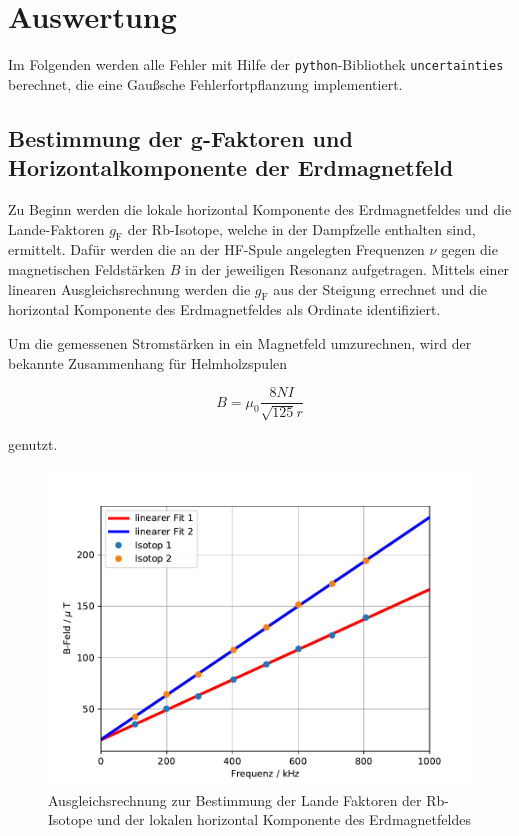 \section{Auswertung}
Im Folgenden werden alle Fehler mit Hilfe der \texttt{python}-Bibliothek
\texttt{uncertainties}\cite{py-uncertainties} berechnet, die eine Gaußsche
Fehlerfortpflanzung implementiert.

\subsection{Bestimmung der g-Faktoren und Horizontalkomponente der Erdmagnetfeld}
Zu Beginn werden die lokale horizontal Komponente des Erdmagnetfeldes und die Lande-Faktoren $g_\text{F}$ der Rb-Isotope, welche in der Dampfzelle enthalten sind, ermittelt.
Dafür werden die an der HF-Spule angelegten Frequenzen $\nu$ gegen die magnetischen Feldstärken $B$ in der jeweiligen Resonanz aufgetragen. Mittels einer linearen Ausgleichsrechnung werden die $g_\text{F}$ aus der Steigung errechnet und die horizontal Komponente des Erdmagnetfeldes als Ordinate identifiziert.

Um die gemessenen Stromstärken in ein Magnetfeld umzurechnen, wird der bekannte Zusammenhang für Helmholzspulen

\begin{equation}
B = \mu_0 \frac{8NI}{\sqrt{125} r}
\end{equation}

genutzt.

\begin{figure}[h]
\centering
\includegraphics[scale=0.8]{img/plotLande.pdf}
\caption{Ausgleichsrechnung zur Bestimmung der Lande Faktoren der Rb-Isotope und der lokalen horizontal Komponente des Erdmagnetfeldes}
\label{abb:gfak}
\end{figure}

